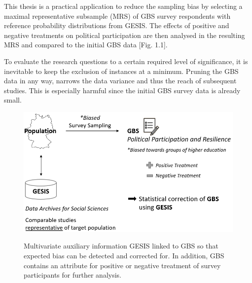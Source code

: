 This thesis is a practical application to reduce the sampling bias by selecting a maximal representative subsample (MRS) of GBS survey respondents with reference probability distributions from GESIS. The effects of positive and negative treatments on political participation are then analysed in the resulting MRS and compared to the initial GBS data [Fig. 1.1].

To evaluate the research questions to a certain required level of significance, it is inevitable to keep the exclusion of instances at a minimum. Pruning the GBS data in any way, narrows the data variance and thus the reach of subsequent studies. This is especially harmful since the initial GBS survey data is already small.

\vspace{20pt}
\begin{figure}[ht]
	\begin{center}
		\captionsetup{width= 380pt}
		\includegraphics[scale=0.60,angle=0]{fig/overview}
		\label{project}
		\caption{Multivariate auxiliary information GESIS linked to GBS so that expected bias can be detected and corrected for. In addition, GBS contains an attribute for positive or negative treatment of survey participants for further analysis.}
	\end{center}
\end{figure}

